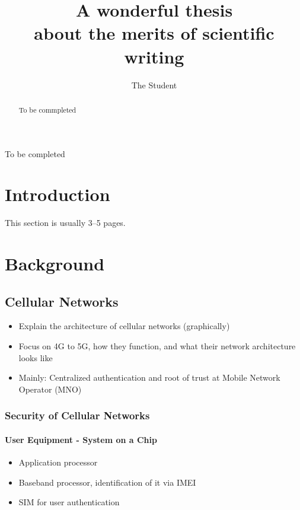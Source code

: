 \documentclass[a4paper,11pt,oneside]{report}
\title{A wonderful thesis\\about the merits of scientific writing}
\author{The Student}
\begin{document}
\maketitle
\makededication
\makeacks

\begin{abstract}
To be commpleted
\end{abstract}

\begin{frenchabstract}
To be completed
\end{frenchabstract}

\maketoc

\chapter{Introduction}

This section is usually 3--5 pages.

\chapter{Background}

\section{Cellular Networks}
\begin{itemize}
  \item Explain the architecture of cellular networks (graphically)
  \item Focus on 4G to 5G, how they function, and what their network architecture looks like
  \item Mainly: Centralized authentication and root of trust at Mobile Network Operator (MNO)
\end{itemize}

\subsection{Security of Cellular Networks}
\subsubsection{User Equipment - System on a Chip}
\begin{itemize}
  \item Application processor
  \item Baseband processor, identification of it via IMEI
  \item SIM for user authentication
\end{itemize}
\end{document}
